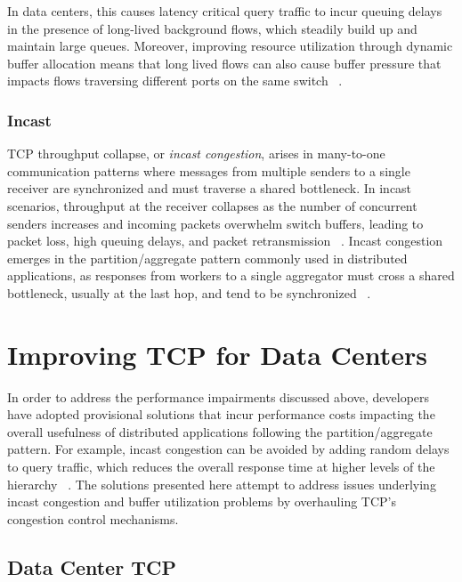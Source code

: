 In data centers, this causes latency critical query traffic to incur queuing delays in the presence of long-lived background flows, which steadily build up and maintain large queues. Moreover, improving resource utilization through dynamic buffer allocation means that long lived flows can also cause buffer pressure that impacts flows traversing different ports on the same switch ~\cite{alizadeh_data_2010}.

\subsubsection{Incast}

TCP throughput collapse, or \emph{incast congestion}, arises in many-to-one communication patterns where messages from multiple senders to a single receiver are synchronized and must traverse a shared bottleneck. In incast scenarios, throughput at the receiver collapses as the number of concurrent senders increases and incoming packets overwhelm switch buffers, leading to packet loss, high queuing delays, and packet retransmission ~\cite{chen_understanding_2009, phanishayee_measurement_2008}. Incast congestion emerges in the partition/aggregate pattern commonly used in distributed applications, as responses from workers to a single aggregator must cross a shared bottleneck, usually at the last hop, and tend to be synchronized ~\cite{alizadeh_data_2010, wu_ictcp:_2013}.

\section{Improving TCP for Data Centers}

In order to address the performance impairments discussed above, developers have adopted provisional solutions that incur performance costs impacting the overall usefulness of distributed applications following the partition/aggregate pattern. For example, incast congestion can be avoided by adding random delays to query traffic, which reduces the overall response time at higher levels of the hierarchy ~\cite{alizadeh_data_2010, floyd_synchronization_1994}. The solutions presented here attempt to address issues underlying incast congestion and buffer utilization problems by overhauling TCP's congestion control mechanisms.

\subsection{Data Center TCP}

